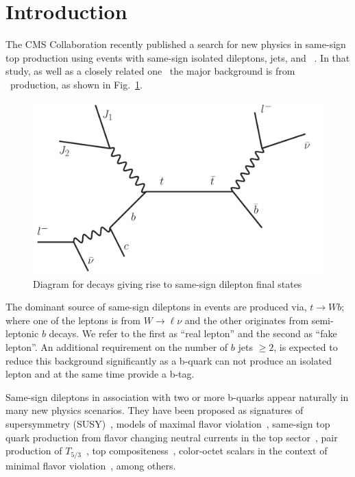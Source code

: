 \section{Introduction}
\label{sec:intro}
The CMS Collaboration recently published a search for new physics
in same-sign top production using events with same-sign isolated dileptons, jets, and \met~\cite{sstop}. 
In that study, as well as a closely related one~\cite{sspaper} the major
background is from \ttbar\ production, as shown in Fig.~\ref{fig:ttbar}.

\begin{figure}[htb]
\begin{center}
\includegraphics[width=0.6\linewidth, height=0.35\linewidth]{figs/ttbar.pdf}
\caption{ Diagram for \ttbar decays giving rise to same-sign dilepton final states \label{fig:ttbar}}
\end{center}
\end{figure}

The dominant source of same-sign dileptons in \ttbar events are produced via, $t \rightarrow W b$; where 
one of the leptons is from $W \rightarrow \ell \nu $ and the other originates from semi-leptonic $b$ decays. 
We refer to the first as ``real lepton'' and the second as ``fake lepton''.
An additional requirement on the number of $b$ jets $\geq 2$, is expected to reduce this background significantly
as a b-quark can not produce an isolated lepton and at the same time provide a b-tag.

Same-sign dileptons in association with two or more b-quarks appear naturally in many new physics scenarios.
They have been proposed as signatures of supersymmetry 
(SUSY)~\cite{stopVirtual,stopReal,
sgluons,wacker,naturalness1,naturalness2,naturalness3,naturalness4}, 
models of maximal flavor violation~\cite{mxflv1,mxflv2,mxflv3}, 
same-sign top quark production from flavor changing neutral currents in the top sector~\cite{fcnczprime}, 
pair production of $T_{5/3}$~\cite{t53},
top compositeness~\cite{topcomp1,topcomp2,topcomp3},
color-octet scalars in the context of minimal flavor violation~\cite{colorOctetScalars}, 
among others.

